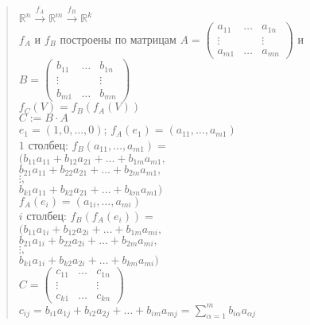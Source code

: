\documentclass{article}
\begin{document}
	\begin{quote}
		$\mathbb{R}^n \xrightarrow{f_A} \mathbb{R}^m \xrightarrow{f_B} \mathbb{R}^k$ \\
		$f_A$ и $f_B$ построены по матрицам $A = \left(
		\begin{smallmatrix}
			a_{11} & \dots & a_{1n} \\
			\vdots &  & \vdots \\
			a_{m1} & \dots & a_{mn}
		\end{smallmatrix}
		\right)$ и $B = \left(
		\begin{smallmatrix}
			b_{11} & \dots & b_{1n} \\
			\vdots &  & \vdots \\
			b_{m1} & \dots & b_{mn}
		\end{smallmatrix}
		\right)$ \\
		$f_C (V) = f_B (f_A (V))$ \\
		$C := B \cdot A$ \\
		$e_1 = (1, 0, \dots, 0)$; $f_A (e_1) = (a_{11}, \dots, a_{m1})$ \\
		$1$ столбец: $f_B (a_{11}, \dots, a_{m1}) =$ \\
		$(b_{11} a_{11} + b_{12} a_{21} + \dots + b_{1m}a_{m1},$ \\
		$b_{21}a_{11} + b_{22} a_{21} + \dots + b_{2m} a_{m1},$ \\
		$\vdots,$ \\
		$b_{k1} a_{11} + b_{k2} a_{21} + \dots + b_{km} a_{m1})$ \\
		$f_A (e_i) = (a_{1i}, \dots, a_{mi})$ \\
		$i$ столбец: $f_B (f_A (e_i)) =$ \\
		$(b_{11} a_{1i} + b_{12} a_{2i} + \dots + b_{1m}a_{mi},$ \\
		$b_{21}a_{1i} + b_{22} a_{2i} + \dots + b_{2m} a_{mi},$ \\
		$\vdots,$ \\
		$b_{k1} a_{1i} + b_{k2} a_{2i} + \dots + b_{km} a_{mi})$ \\
		$C = \left(
		\begin{smallmatrix}
			c_{11} & \dots & c_{1n} \\
			\vdots &  & \vdots \\
			c_{k1} & \dots & c_{kn}
		\end{smallmatrix}
		\right)$ \\
		$c_{ij} = b_{i1} a_{1j} + b_{i2} a_{2j} + \dots + b_{im} a_{mj} = \sum\limits_{\alpha = 1}^{m}b_{i \alpha} a_{\alpha j}$
	\end{quote}
\end{document}
